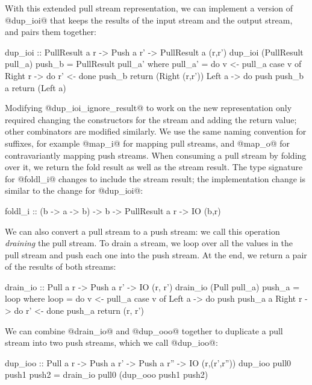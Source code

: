 With this extended pull stream representation, we can implement a version of @dup_ioi@ that keeps the results of the input stream and the output stream, and pairs them together:

\begin{haskell}
dup_ioi :: PullResult a r -> Push a r' -> PullResult a (r,r')
dup_ioi (PullResult pull_a) push_b = PullResult pull_a'
 where
  pull_a' = do
    v <- pull_a
    case v of
     Right r -> do
      r' <- done push_b
      return (Right (r,r'))
     Left a -> do
      push push_b a
      return (Left a)
\end{haskell}

Modifying @dup_ioi_ignore_result@ to work on the new representation only required changing the constructors for the stream and adding the return value; other combinators are modified similarly.
We use the same naming convention for suffixes, for example @map_i@ for mapping pull streams, and @map_o@ for contravariantly mapping push streams.
When consuming a pull stream by folding over it, we return the fold result as well as the stream result.
The type signature for @foldl_i@ changes to include the stream result; the implementation change is similar to the change for @dup_ioi@:

\begin{haskell}
foldl_i :: (b -> a -> b) -> b -> PullResult a r -> IO (b,r)
\end{haskell}

We can also convert a pull stream to a push stream: we call this operation \emph{draining} the pull stream.
To drain a stream, we loop over all the values in the pull stream and push each one into the push stream.
At the end, we return a pair of the results of both streams:

\begin{haskell}
drain_io :: Pull a r -> Push a r' -> IO (r, r')
drain_io (Pull pull_a) push_a = loop
 where
  loop = do
    v <- pull_a
    case v of
     Left a -> do
      push push_a a
     Right r -> do
      r' <- done push_a
      return (r, r')
\end{haskell}

We can combine @drain_io@ and @dup_ooo@ together to duplicate a pull stream into two push streams, which we call @dup_ioo@:

\begin{haskell}
dup_ioo :: Pull a r -> Push a r' -> Push a r'' -> IO (r,(r',r''))
dup_ioo pull0 push1 push2 = drain_io pull0 (dup_ooo push1 push2)
\end{haskell}

